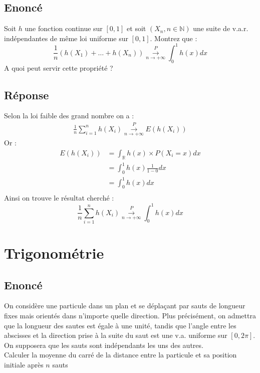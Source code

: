 \documentclass[10pt,a4paper,twoside]{article}
\begin{document}
\subsection*{Enoncé}
Soit $h$ une fonction continue sur $[0,1]$ et soit $(X_{n},n\in\mathbb{N})$ une suite de v.a.r. indépendantes de même loi uniforme sur $[0,1]$. Montrez que :
\[ \frac{1}{n}(h(X_{1})+\ldots+h(X_{n})) \overset{P}{\underset{n\rightarrow+\infty}{\longrightarrow}} \int_{0}^{1} h(x)dx \]
A quoi peut servir cette propriété ?

\subsection*{Réponse}
Selon la loi faible des grand nombre on a :
\begin{align*}
\frac{1}{n} \sum_{i=1}^{n} h(X_{i}) \overset{P}{\underset{n\rightarrow+\infty}{\longrightarrow}} E(h(X_{i}))
\end{align*}
Or :
\begin{align*}
E(h(X_{i})) &= \int_{\mathbb{R}} h(x) \times P(X_{i}=x) dx\\
&= \int_{0}^{1} h(x) \frac{1}{1-0} dx\\
&= \int_{0}^{1} h(x) dx\\
\end{align*}
Ainsi on trouve le résultat cherché :
\[ \frac{1}{n} \sum_{i=1}^{n} h(X_{i}) \overset{P}{\underset{n\rightarrow+\infty}{\longrightarrow}} \int_{0}^{1} h(x)dx \]

\section{Trigonométrie}
\subsection*{Enoncé}
On considère une particule dans un plan et se déplaçant par sauts de longueur fixes mais orientés dans n'importe quelle direction. Plus précisément, on admettra que la longueur des sautes est égale à une unité, tandis que l'angle entre les abscisses et la direction prise à la suite du saut est une v.a. uniforme sur $[0,2\pi]$. On supposera que les sauts sont indépendants les uns des autres.\\
Calculer la moyenne du carré de la distance entre la particule et sa position initiale après $n$ sauts
\end{document}
